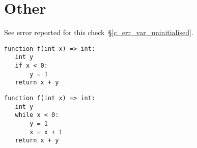 \section{Other}

See error reported for this check~\S\ref{c_err_var_uninitialised}.

\begin{lstlisting}
function f(int x) => int:
   int y
   if x < 0:
       y = 1
   return x + y
\end{lstlisting}

\begin{lstlisting}
function f(int x) => int:
   int y
   while x < 0:
       y = 1
       x = x + 1
   return x + y
\end{lstlisting}
